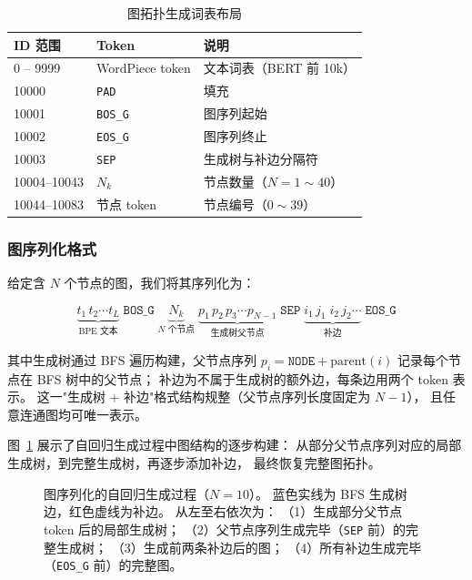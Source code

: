 \begin{table}[h]
\centering
\caption{图拓扑生成词表布局}
\label{tab:vocab}
\small
\begin{tabular}{lll}
\toprule
ID 范围 & Token & 说明 \\
\midrule
0 -- 9999    & WordPiece token & 文本词表（BERT 前 10k） \\
10000        & \texttt{PAD}    & 填充 \\
10001        & \texttt{BOS\_G} & 图序列起始 \\
10002        & \texttt{EOS\_G} & 图序列终止 \\
10003        & \texttt{SEP}    & 生成树与补边分隔符 \\
10004--10043 & $N_k$           & 节点数量（$N=1{\sim}40$） \\
10044--10083 & 节点 token       & 节点编号（$0{\sim}39$） \\
\bottomrule
\end{tabular}
\end{table}

\subsubsection{图序列化格式}

给定含 $N$ 个节点的图，我们将其序列化为：

\begin{equation}
\underbrace{t_1\, t_2 \cdots t_L}_{\text{BPE 文本}}\;
\texttt{BOS\_G}\;
\underbrace{N_k}_{N \text{ 个节点}}\;
\underbrace{p_1\, p_2\, p_3 \cdots p_{N-1}}_{\text{生成树父节点}}\;
\texttt{SEP}\;
\underbrace{i_1\, j_1\; i_2\, j_2 \cdots}_{\text{补边}}\;
\texttt{EOS\_G}
\label{eq:seq}
\end{equation}

其中生成树通过 BFS 遍历构建，父节点序列 $p_i = \texttt{NODE} + \mathrm{parent}(i)$
记录每个节点在 BFS 树中的父节点；
补边为不属于生成树的额外边，每条边用两个 token 表示。
这一"生成树 + 补边"格式结构规整（父节点序列长度固定为 $N-1$），
且任意连通图均可唯一表示。

图~\ref{fig:seq_graph} 展示了自回归生成过程中图结构的逐步构建：
从部分父节点序列对应的局部生成树，到完整生成树，再逐步添加补边，
最终恢复完整图拓扑。

\begin{figure}[t]
    \centering
    
    \caption{
        图序列化的自回归生成过程（$N=10$）。
        蓝色实线为 BFS 生成树边，红色虚线为补边。
        从左至右依次为：
        （1）生成部分父节点 token 后的局部生成树；
        （2）父节点序列生成完毕（\texttt{SEP} 前）的完整生成树；
        （3）生成前两条补边后的图；
        （4）所有补边生成完毕（\texttt{EOS\_G} 前）的完整图。
    }
    \label{fig:seq_graph}
\end{figure}


